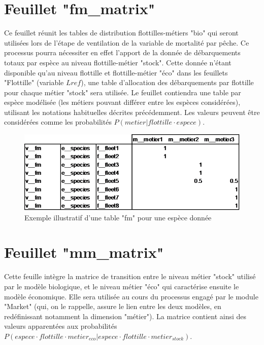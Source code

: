 \documentclass[12pt, colorinlistoftodos]{article}
\newenvironment{not used}[1]{%
    \longtable{%
        |>{\centering$\displaystyle}A{#1}{1}<{$}%
        |}\hline\ignorespaces}{%
    \endlongtable\ignorespacesafterend}
\begin{document}
\section{Feuillet "fm\_matrix"}

Ce feuillet réunit les tables de distribution flottilles-métiers "bio" qui seront utilisées lors de l'étape de ventilation de la variable de mortalité par pêche. Ce processus pourra nécessiter en effet l'apport de la donnée de débarquements totaux par espèce au niveau flottille-métier "stock". Cette donnée n'étant disponible qu'au niveau flottille et flottille-métier "éco" dans les feuillets "Flottille" (variable $Lref$), une table d'allocation des débarquements par flottille pour chaque métier "stock" sera utilisée. Le feuillet contiendra une table par espèce modélisée (les métiers pouvant différer entre les espèces considérées), utilisant les notations habituelles décrites précédemment. Les valeurs peuvent être considérées comme les probabilités $P (metier | flottille \cdot espece)$.

\begin{figure}[h!]
    \begin{center}
    \includegraphics[width = 13.4cm]{figures/param/stock9.png}
    \end{center}
    \caption{Exemple illustratif d'une table "fm" pour une espèce donnée}
    \label{fig:fm}
\end{figure}


\section{Feuillet "mm\_matrix"}

Cette feuille intègre la matrice de transition entre le niveau métier "stock" utilisé par le modèle biologique, et le niveau métier "éco" qui caractérise ensuite le modèle économique. Elle sera utilisée au cours du processus engagé par le module "Market" (qui, on le rappelle, assure le lien entre les deux modèles, en redéfinissant notamment la dimension "métier"). La matrice contient ainsi des valeurs apparentées aux probabilités $P(espece \cdot flottille \cdot metier_{eco} | espece \cdot flottille \cdot metier_{stock})$.
\end{document}
